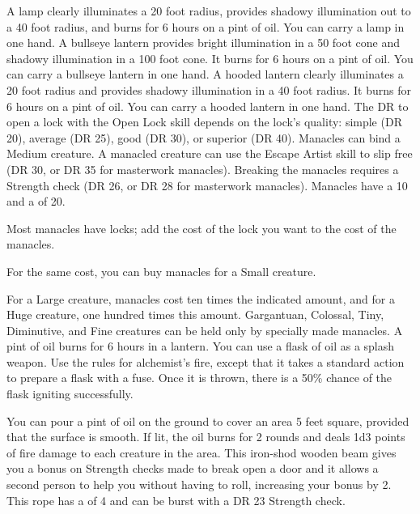          A lamp clearly illuminates a 20 foot radius, provides shadowy illumination out to a 40 foot radius, and burns for 6 hours on a pint of oil. You can carry a lamp in one hand.
         A bullseye lantern provides bright illumination in a 50 foot cone and shadowy illumination in a 100 foot cone. It burns for 6 hours on a pint of oil. You can carry a bullseye lantern in one hand.
         A hooded lantern clearly illuminates a 20 foot radius and provides shadowy illumination in a 40 foot radius. It burns for 6 hours on a pint of oil. You can carry a hooded lantern in one hand.
         The DR to open a lock with the Open Lock skill depends on the lock's quality: simple (DR 20), average (DR 25), good (DR 30), or superior (DR 40).
         Manacles can bind a Medium creature. A manacled creature can use the Escape Artist skill to slip free (DR 30, or DR 35 for masterwork manacles). Breaking the manacles requires a Strength check (DR 26, or DR 28 for masterwork manacles). Manacles have a  10 and a  of 20.
        \par Most manacles have locks; add the cost of the lock you want to the cost of the manacles.
        \par For the same cost, you can buy manacles for a Small creature.
        \par For a Large creature, manacles cost ten times the indicated amount, and for a Huge creature, one hundred times this amount. Gargantuan, Colossal, Tiny, Diminutive, and Fine creatures can be held only by specially made manacles.
         A pint of oil burns for 6 hours in a lantern. You can use a flask of oil as a splash weapon. Use the rules for alchemist's fire, except that it takes a standard action to prepare a flask with a fuse. Once it is thrown, there is a 50\% chance of the flask igniting successfully.
        \par You can pour a pint of oil on the ground to cover an area 5 feet square, provided that the surface is smooth. If lit, the oil burns for 2 rounds and deals 1d3 points of fire damage to each creature in the area.
         This iron-shod wooden beam gives you a  bonus on Strength checks made to break open a door and it allows a second person to help you without having to roll, increasing your bonus by 2.
         This rope has a  of 4 and can be burst with a DR 23 Strength check.

